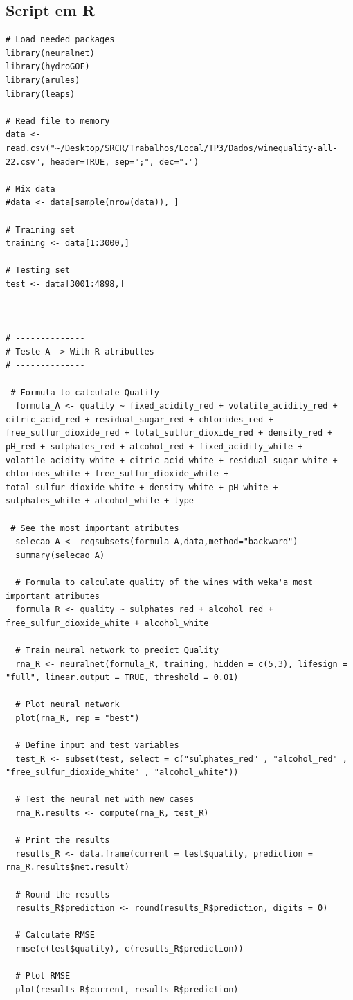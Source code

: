 \documentclass{report}
\begin{document}
\subsection{Script em R}
\begin{verbatim}
# Load needed packages
library(neuralnet)
library(hydroGOF)
library(arules)
library(leaps)

# Read file to memory
data <- read.csv("~/Desktop/SRCR/Trabalhos/Local/TP3/Dados/winequality-all-22.csv", header=TRUE, sep=";", dec=".")

# Mix data
#data <- data[sample(nrow(data)), ]

# Training set
training <- data[1:3000,]

# Testing set
test <- data[3001:4898,]



# --------------
# Teste A -> With R atributtes 
# --------------

 # Formula to calculate Quality
  formula_A <- quality ~ fixed_acidity_red + volatile_acidity_red + citric_acid_red + residual_sugar_red + chlorides_red + free_sulfur_dioxide_red + total_sulfur_dioxide_red + density_red + pH_red + sulphates_red + alcohol_red + fixed_acidity_white + volatile_acidity_white + citric_acid_white + residual_sugar_white + chlorides_white + free_sulfur_dioxide_white + total_sulfur_dioxide_white + density_white + pH_white + sulphates_white + alcohol_white + type
 
 # See the most important atributes
  selecao_A <- regsubsets(formula_A,data,method="backward")
  summary(selecao_A)
  
  # Formula to calculate quality of the wines with weka'a most important atributes
  formula_R <- quality ~ sulphates_red + alcohol_red + free_sulfur_dioxide_white + alcohol_white
  
  # Train neural network to predict Quality
  rna_R <- neuralnet(formula_R, training, hidden = c(5,3), lifesign = "full", linear.output = TRUE, threshold = 0.01)
  
  # Plot neural network
  plot(rna_R, rep = "best")
  
  # Define input and test variables
  test_R <- subset(test, select = c("sulphates_red" , "alcohol_red" , "free_sulfur_dioxide_white" , "alcohol_white"))
  
  # Test the neural net with new cases
  rna_R.results <- compute(rna_R, test_R)
  
  # Print the results
  results_R <- data.frame(current = test$quality, prediction = rna_R.results$net.result)
  
  # Round the results
  results_R$prediction <- round(results_R$prediction, digits = 0)
  
  # Calculate RMSE
  rmse(c(test$quality), c(results_R$prediction))
  
  # Plot RMSE
  plot(results_R$current, results_R$prediction)
\end{verbatim}
\end{document}
